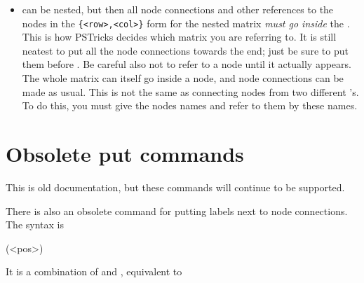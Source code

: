 \documentclass[11pt,english,BCOR10mm,DIV12,bibliography=totoc,parskip=false,smallheadings
    headexclude,footexclude,oneside]{pst-doc}
\begin{document}
\begin{itemize}
\begin{BDef}
\end{BDef}

 \emph{at the end of the entry}. This is like Plain \TeX's , or
 \LaTeX's , but the template for the current column (the first
  column that is spanned) is still used. If you want wipe out the template as
  well, use  \emph{at the beginning of the entry} instead.
  If you just want to wipe out the template, use  before the entry.

  \item {} can be nested, but then all node connections and other
  references to the nodes in the \verb|{<row>,<col>}| form for the nested matrix
  \emph{must go inside} the . This is how  PSTricks decides which
  matrix you are referring to. It is still neatest to put all the node
  connections towards the end; just be sure to put them before .
  Be careful also not to refer to a node until it actually appears. The whole
  matrix can itself go inside a node, and node connections can be made as
  usual. This is not the same as connecting nodes from two different
  's. To do this, you must give the nodes names and refer to them
  by these names.

\end{itemize}

\section{Obsolete put commands}

This is old documentation, but these commands will continue to be supported.

There is also an obsolete command  for putting labels
next to node connections. The syntax is

\begin{BDef}
  \Largr(<pos>)
\end{BDef}

It is a combination of  and , equivalent to

\begin{BDef}
\end{BDef}
\end{document}
